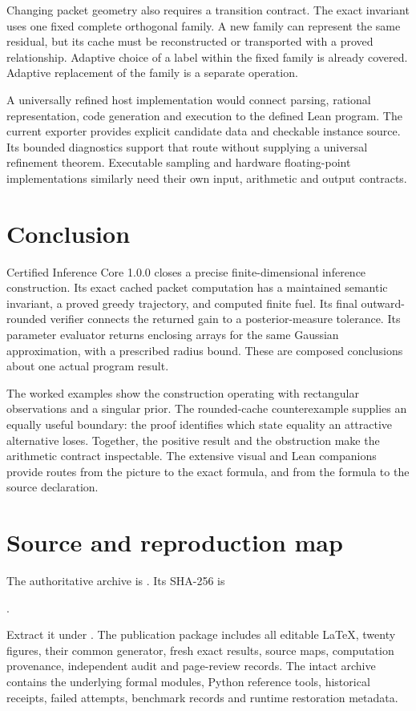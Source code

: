 Changing packet geometry also requires a transition contract. The exact invariant uses one fixed complete orthogonal family. A new family can represent the same residual, but its cache must be reconstructed or transported with a proved relationship. Adaptive choice of a label within the fixed family is already covered. Adaptive replacement of the family is a separate operation.

A universally refined host implementation would connect parsing, rational representation, code generation and execution to the defined Lean program. The current exporter provides explicit candidate data and checkable instance source. Its bounded diagnostics support that route without supplying a universal refinement theorem. Executable sampling and hardware floating-point implementations similarly need their own input, arithmetic and output contracts.

\section{Conclusion}
Certified Inference Core 1.0.0 closes a precise finite-dimensional inference construction. Its exact cached packet computation has a maintained semantic invariant, a proved greedy trajectory, and computed finite fuel. Its final outward-rounded verifier connects the returned gain to a posterior-measure tolerance. Its parameter evaluator returns enclosing arrays for the same Gaussian approximation, with a prescribed radius bound. These are composed conclusions about one actual program result.

The worked examples show the construction operating with rectangular observations and a singular prior. The rounded-cache counterexample supplies an equally useful boundary: the proof identifies which state equality an attractive alternative loses. Together, the positive result and the obstruction make the arithmetic contract inspectable. The extensive visual and Lean companions provide routes from the picture to the exact formula, and from the formula to the source declaration.

\appendix
\section{Source and reproduction map}
The authoritative archive is . Its SHA-256 is
\begin{center}\small{}.\end{center}
Extract it under . The publication package includes all editable LaTeX, twenty figures, their common generator, fresh exact results, source maps, computation provenance, independent audit and page-review records. The intact archive contains the underlying formal modules, Python reference tools, historical receipts, failed attempts, benchmark records and runtime restoration metadata.

